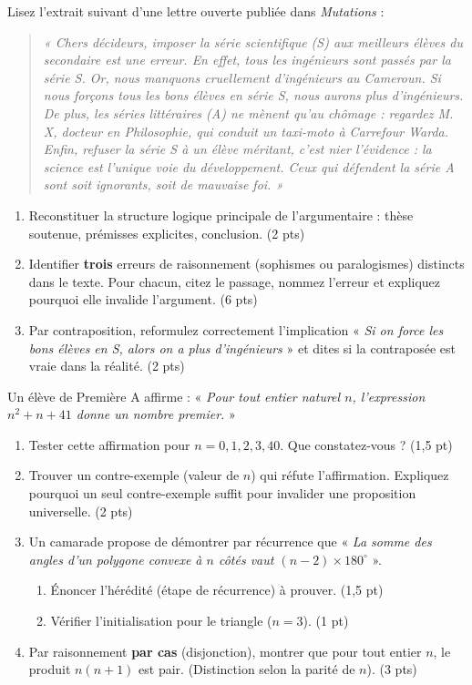 \documentclass[11pt]{article}
\begin{document}
\begin{exercice}
Lisez l'extrait suivant d'une lettre ouverte publiée dans \textit{Mutations} :
\begin{quote}
\textit{« Chers décideurs, imposer la série scientifique (S) aux meilleurs élèves du secondaire est une erreur. En effet, tous les ingénieurs sont passés par la série S. Or, nous manquons cruellement d'ingénieurs au Cameroun. Si nous forçons tous les bons élèves en série S, nous aurons plus d'ingénieurs. De plus, les séries littéraires (A) ne mènent qu'au chômage : regardez M. X, docteur en Philosophie, qui conduit un taxi-moto à Carrefour Warda. Enfin, refuser la série S à un élève méritant, c'est nier l'évidence : la science est l'unique voie du développement. Ceux qui défendent la série A sont soit ignorants, soit de mauvaise foi. »}
\end{quote}
\begin{enumerate}
    \item Reconstituer la structure logique principale de l'argumentaire : thèse soutenue, prémisses explicites, conclusion. (2 pts)
    \item Identifier \textbf{trois} erreurs de raisonnement (sophismes ou paralogismes) distincts dans le texte. Pour chacun, citez le passage, nommez l'erreur et expliquez pourquoi elle invalide l'argument. (6 pts)
    \item Par contraposition, reformulez correctement l'implication « \textit{Si on force les bons élèves en S, alors on a plus d'ingénieurs} » et dites si la contraposée est vraie dans la réalité. (2 pts)
\end{enumerate}
\end{exercice}

\begin{exercice}
Un élève de Première A affirme : « \textit{Pour tout entier naturel $n$, l'expression $n^2 + n + 41$ donne un nombre premier.} »
\begin{enumerate}
    \item Tester cette affirmation pour $n = 0, 1, 2, 3, 40$. Que constatez-vous ? (1,5 pt)
    \item Trouver un contre-exemple (valeur de $n$) qui réfute l'affirmation. Expliquez pourquoi un seul contre-exemple suffit pour invalider une proposition universelle. (2 pts)
    \item Un camarade propose de démontrer par récurrence que « \textit{La somme des angles d'un polygone convexe à $n$ côtés vaut $(n-2)\times 180^\circ$} ».
    \begin{enumerate}
        \item Énoncer l'hérédité (étape de récurrence) à prouver. (1,5 pt)
        \item Vérifier l'initialisation pour le triangle ($n=3$). (1 pt)
    \end{enumerate}
    \item Par raisonnement \textbf{par cas} (disjonction), montrer que pour tout entier $n$, le produit $n(n+1)$ est pair. (Distinction selon la parité de $n$). (3 pts)
\end{enumerate}
\end{exercice}
\end{document}
